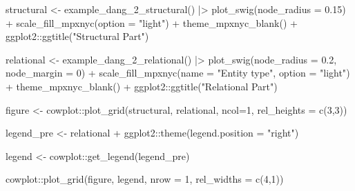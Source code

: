 \documentclass[
  letterpaper,
  DIV=11,
  numbers=noendperiod,
  oneside]{scrreprt}
\newenvironment{Shaded}{\begin{snugshade}}{\end{snugshade}}
\newcommand{\AttributeTok}[1]{\textcolor[rgb]{0.40,0.45,0.13}{#1}}
\newcommand{\DecValTok}[1]{\textcolor[rgb]{0.68,0.00,0.00}{#1}}
\newcommand{\FloatTok}[1]{\textcolor[rgb]{0.68,0.00,0.00}{#1}}
\newcommand{\FunctionTok}[1]{\textcolor[rgb]{0.28,0.35,0.67}{#1}}
\newcommand{\NormalTok}[1]{\textcolor[rgb]{0.00,0.23,0.31}{#1}}
\newcommand{\OtherTok}[1]{\textcolor[rgb]{0.00,0.23,0.31}{#1}}
\newcommand{\SpecialCharTok}[1]{\textcolor[rgb]{0.37,0.37,0.37}{#1}}
\newcommand{\StringTok}[1]{\textcolor[rgb]{0.13,0.47,0.30}{#1}}
\begin{document}
\begin{Shaded}
\begin{Highlighting}[]
\NormalTok{structural  }\OtherTok{\textless{}{-}} \FunctionTok{example\_dang\_2\_structural}\NormalTok{() }\SpecialCharTok{|\textgreater{}}
                    \FunctionTok{plot\_swig}\NormalTok{(}\AttributeTok{node\_radius =} \FloatTok{0.15}\NormalTok{) }\SpecialCharTok{+}
                    \FunctionTok{scale\_fill\_mpxnyc}\NormalTok{(}\AttributeTok{option =} \StringTok{"light"}\NormalTok{) }\SpecialCharTok{+}
                    \FunctionTok{theme\_mpxnyc\_blank}\NormalTok{() }\SpecialCharTok{+}
\NormalTok{                    ggplot2}\SpecialCharTok{::}\FunctionTok{ggtitle}\NormalTok{(}\StringTok{"Structural Part"}\NormalTok{)}


\NormalTok{relational  }\OtherTok{\textless{}{-}} \FunctionTok{example\_dang\_2\_relational}\NormalTok{() }\SpecialCharTok{|\textgreater{}}
                    \FunctionTok{plot\_swig}\NormalTok{(}\AttributeTok{node\_radius =} \FloatTok{0.2}\NormalTok{, }\AttributeTok{node\_margin =} \DecValTok{0}\NormalTok{)  }\SpecialCharTok{+}
                    \FunctionTok{scale\_fill\_mpxnyc}\NormalTok{(}\AttributeTok{name =} \StringTok{"Entity type"}\NormalTok{, }\AttributeTok{option =} \StringTok{"light"}\NormalTok{) }\SpecialCharTok{+}
                    \FunctionTok{theme\_mpxnyc\_blank}\NormalTok{() }\SpecialCharTok{+}
\NormalTok{                    ggplot2}\SpecialCharTok{::}\FunctionTok{ggtitle}\NormalTok{(}\StringTok{"Relational Part"}\NormalTok{) }

\NormalTok{figure   }\OtherTok{\textless{}{-}}\NormalTok{ cowplot}\SpecialCharTok{::}\FunctionTok{plot\_grid}\NormalTok{(structural, relational, }\AttributeTok{ncol=}\DecValTok{1}\NormalTok{, }\AttributeTok{rel\_heights =} \FunctionTok{c}\NormalTok{(}\DecValTok{3}\NormalTok{,}\DecValTok{3}\NormalTok{))}



\NormalTok{legend\_pre  }\OtherTok{\textless{}{-}}\NormalTok{ relational }\SpecialCharTok{+}\NormalTok{ ggplot2}\SpecialCharTok{::}\FunctionTok{theme}\NormalTok{(}\AttributeTok{legend.position =} \StringTok{"right"}\NormalTok{)}

\NormalTok{legend      }\OtherTok{\textless{}{-}}\NormalTok{ cowplot}\SpecialCharTok{::}\FunctionTok{get\_legend}\NormalTok{(legend\_pre) }
 
   
\NormalTok{cowplot}\SpecialCharTok{::}\FunctionTok{plot\_grid}\NormalTok{(figure, legend, }\AttributeTok{nrow =} \DecValTok{1}\NormalTok{, }\AttributeTok{rel\_widths =} \FunctionTok{c}\NormalTok{(}\DecValTok{4}\NormalTok{,}\DecValTok{1}\NormalTok{))}
\end{Highlighting}
\end{Shaded}
\end{document}
